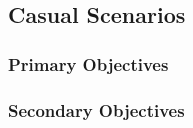 \subsection{Casual Scenarios}



\subsubsection{Primary Objectives}



\newpage

\subsubsection{Secondary Objectives}


